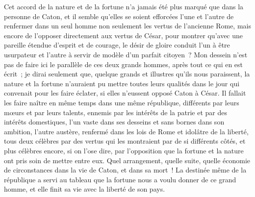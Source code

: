 \documentclass[french,twoside]{book} %
\begin{document}
Cet accord de la nature et de la fortune n’a jamais été plus marqué que dans la personne de Caton, et il semble qu’elles se soient efforcées l’une et l’autre de renfermer dans un seul homme non seulement les vertus de l’ancienne Rome, mais encore de l’opposer directement aux vertus de César, pour montrer qu’avec une pareille étendue d’esprit et de courage, le désir de gloire conduit l’un à être usurpateur et l’autre à servir de modèle d’un parfait citoyen ? Mon dessein n’est pas de faire ici le parallèle de ces deux grands hommes, après tout ce qui en est écrit ; je dirai seulement que, quelque grands et illustres qu’ils nous paraissent, la nature et la fortune n’auraient pu mettre toutes leurs qualités dans le jour qui convenait pour les faire éclater, si elles n’eussent opposé Caton à César. Il fallait les faire naître en même temps dans une même république, différents par leurs mœurs et par leurs talents, ennemis par les intérêts de la patrie et par des intérêts domestiques, l’un vaste dans ses desseins et sans bornes dans son ambition, l’autre austère, renfermé dans les lois de Rome et idolâtre de la liberté, tous deux célèbres par des vertus qui les montraient par de si différents côtés, et plus célèbres encore, si on l’ose dire, par l’opposition que la fortune et la nature ont pris soin de mettre entre eux. Quel arrangement, quelle suite, quelle économie de circonstances dans la vie de Caton, et dans sa mort ! La destinée même de la république a servi au tableau que la fortune nous a voulu donner de ce grand homme, et elle finit sa vie avec la liberté de son pays.\par
\end{document}
